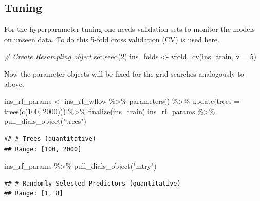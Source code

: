 \documentclass[
]{book}
\newenvironment{Shaded}{\begin{snugshade}}{\end{snugshade}}
\newcommand{\AttributeTok}[1]{\textcolor[rgb]{0.77,0.63,0.00}{#1}}
\newcommand{\CommentTok}[1]{\textcolor[rgb]{0.56,0.35,0.01}{\textit{#1}}}
\newcommand{\DecValTok}[1]{\textcolor[rgb]{0.00,0.00,0.81}{#1}}
\newcommand{\FunctionTok}[1]{\textcolor[rgb]{0.00,0.00,0.00}{#1}}
\newcommand{\NormalTok}[1]{#1}
\newcommand{\OtherTok}[1]{\textcolor[rgb]{0.56,0.35,0.01}{#1}}
\newcommand{\SpecialCharTok}[1]{\textcolor[rgb]{0.00,0.00,0.00}{#1}}
\newcommand{\StringTok}[1]{\textcolor[rgb]{0.31,0.60,0.02}{#1}}
\begin{document}
\hypertarget{tuning-1}{%
\subsection{Tuning}\label{tuning-1}}

For the hyperparameter tuning one needs validation sets to monitor the models on unseen data. To do this 5-fold cross validation (CV) is used here.

\begin{Shaded}
\begin{Highlighting}[]
\CommentTok{\# Create Resampling object}
\FunctionTok{set.seed}\NormalTok{(}\DecValTok{2}\NormalTok{)}
\NormalTok{ins\_folds }\OtherTok{\textless{}{-}} \FunctionTok{vfold\_cv}\NormalTok{(ins\_train, }\AttributeTok{v =} \DecValTok{5}\NormalTok{)}
\end{Highlighting}
\end{Shaded}

Now the parameter objects will be fixed for the grid searches analogously to above.

\begin{Shaded}
\begin{Highlighting}[]
\NormalTok{ins\_rf\_params }\OtherTok{\textless{}{-}}\NormalTok{ ins\_rf\_wflow }\SpecialCharTok{\%\textgreater{}\%}
  \FunctionTok{parameters}\NormalTok{() }\SpecialCharTok{\%\textgreater{}\%}
  \FunctionTok{update}\NormalTok{(}\AttributeTok{trees =} \FunctionTok{trees}\NormalTok{(}\FunctionTok{c}\NormalTok{(}\DecValTok{100}\NormalTok{, }\DecValTok{2000}\NormalTok{))) }\SpecialCharTok{\%\textgreater{}\%}
  \FunctionTok{finalize}\NormalTok{(ins\_train)}
\NormalTok{ins\_rf\_params }\SpecialCharTok{\%\textgreater{}\%} \FunctionTok{pull\_dials\_object}\NormalTok{(}\StringTok{"trees"}\NormalTok{)}
\end{Highlighting}
\end{Shaded}

\begin{verbatim}
## # Trees (quantitative)
## Range: [100, 2000]
\end{verbatim}

\begin{Shaded}
\begin{Highlighting}[]
\NormalTok{ins\_rf\_params }\SpecialCharTok{\%\textgreater{}\%} \FunctionTok{pull\_dials\_object}\NormalTok{(}\StringTok{"mtry"}\NormalTok{)}
\end{Highlighting}
\end{Shaded}

\begin{verbatim}
## # Randomly Selected Predictors (quantitative)
## Range: [1, 8]
\end{verbatim}
\end{document}
